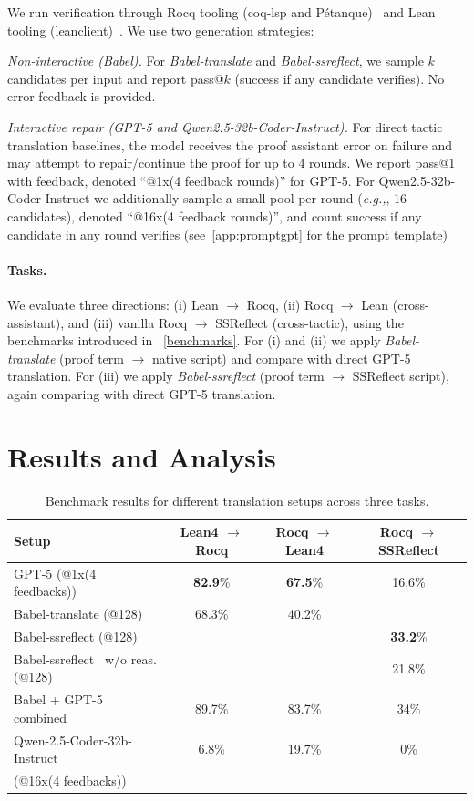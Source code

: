 \documentclass{article}
\newcommand{\eg}{\emph{e.g.,}\xspace}
\begin{document}
We run verification through Rocq tooling (coq-lsp and Pétanque)~\cite{coqlsp, nlir-mathai24} and Lean tooling (leanclient)~\cite{leanclient2025}. We use two generation strategies:

\emph{Non-interactive (Babel).}
For \textit{Babel-translate} and \textit{Babel-ssreflect}, we sample $k$ candidates per input and report pass@$k$ (success if any candidate verifies). No error feedback is provided.

\emph{Interactive repair (GPT-5 and Qwen2.5-32b-Coder-Instruct).}
For direct tactic translation baselines, the model receives the proof assistant error on failure and may attempt to repair/continue the proof for up to $4$ rounds. We report pass@1 with feedback, denoted ``@1x(4 feedback rounds)'' for GPT-5. For Qwen2.5-32b-Coder-Instruct we additionally sample a small pool per round (\eg, 16 candidates), denoted ``@16x(4 feedback rounds)'', and count success if any candidate in any round verifies (see~\cref{app:promptgpt} for the prompt template)

\paragraph{Tasks.}
We evaluate three directions:
(i) Lean $\to$ Rocq,
(ii) Rocq $\to$ Lean (cross-assistant), and
(iii) vanilla Rocq $\to$ SSReflect (cross-tactic), using the benchmarks introduced in ~\cref{benchmarks}.
For (i) and (ii) we apply \textit{Babel-translate} (proof term $\to$ native script) and compare with direct GPT-5 translation.
For (iii) we apply \textit{Babel-ssreflect} (proof term $\to$ SSReflect script), again comparing with direct GPT-5 translation.

\section{Results and Analysis}
\begin{table}[h]
\centering
\begin{tabular}{lccc}
\hline
\textbf{Setup} & \textbf{Lean4 $\to$ Rocq} & \textbf{Rocq $\to$ Lean4} & \textbf{Rocq $\to$ SSReflect} \\
\hline
GPT-5 (@1x(4 feedbacks)) & \textbf{82.9}\% & \textbf{67.5}\% & 16.6\% \\
Babel-translate (@128)            & 68.3\% & 40.2\% &  \\
Babel-ssreflect (@128)            &  &  & \textbf{33.2}\% \\
Babel-ssreflect \ w/o reas. (@128)            &  &  & 21.8\% \\
\midrule
Babel + GPT-5 combined               & 89.7\% & 83.7\% & 34\% \\
\midrule
Qwen-2.5-Coder-32b-Instruct  & 6.8\% & 19.7\% & 0\% \\
(@16x(4 feedbacks)) & & & \\
\hline
\end{tabular} \vspace{1ex}
\caption{Benchmark results for different translation setups across three tasks.}
\label{tab:translation_results}
\end{table}
\end{document}
